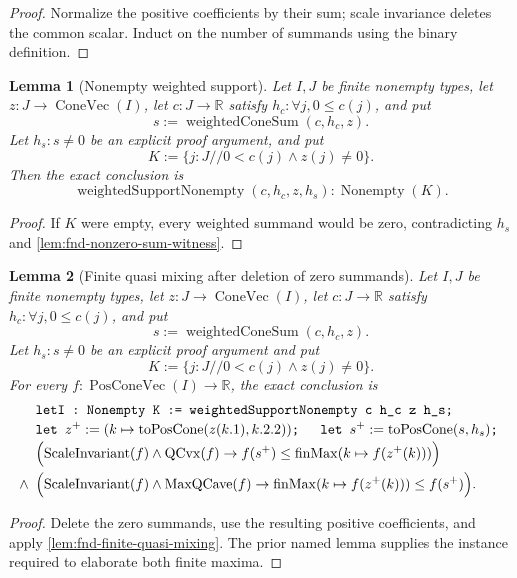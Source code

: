 \documentclass[9pt]{extarticle}
\newtheorem{lemma}{Lemma}[section]
\theoremstyle{definition}
\theoremstyle{remark}
\newcommand{\R}{\mathbb R}
\begin{document}
\begin{proof}
Normalize the positive coefficients by their sum; scale invariance deletes
the common scalar.  Induct on the number of summands using the binary
definition.
\end{proof}

\begin{lemma}[Nonempty weighted support]
\label{lem:fnd-weighted-support-nonempty}
Let $I,J$ be finite nonempty types, let
$z:J\to\operatorname{ConeVec}(I)$, let $c:J\to\R$ satisfy
$h_c:\forall j,0\leq c(j)$, and put
\[
 s:=\operatorname{weightedConeSum}(c,h_c,z).
\]
Let $h_s:s\neq0$ be an explicit proof argument, and put
\[
 K:=\{j:J\mathbin{//}0<c(j)\wedge z(j)\neq0\}.
\]
Then the exact conclusion is
\[
 \operatorname{weightedSupportNonempty}(c,h_c,z,h_s):
 \operatorname{Nonempty}(K).
\]
\end{lemma}

\begin{proof}
If $K$ were empty, every weighted summand would be zero, contradicting
$h_s$ and \cref{lem:fnd-nonzero-sum-witness}.
\end{proof}

\begin{lemma}[Finite quasi mixing after deletion of zero summands]
\label{lem:fnd-finite-quasi-mixing-delete-zero}
Let $I,J$ be finite nonempty types, let
$z:J\to\operatorname{ConeVec}(I)$, let $c:J\to\R$ satisfy
$h_c:\forall j,0\leq c(j)$, and put
\[
 s:=\operatorname{weightedConeSum}(c,h_c,z).
\]
Let $h_s:s\neq0$ be an explicit proof argument and put
\[
 K:=\{j:J\mathbin{//}0<c(j)\wedge z(j)\neq0\}.
\]
For every $f:\operatorname{PosConeVec}(I)\to\R$, the exact conclusion is
\begin{align*}
&\texttt{letI : Nonempty K :=
 weightedSupportNonempty c h\_c z h\_s; }\\[-2pt]
&\texttt{let }z^+:=
 (k\mapsto\operatorname{toPosCone}(z(k.1),k.2.2))\texttt{; }\quad
 \texttt{let }s^+:=\operatorname{toPosCone}(s,h_s)\texttt{; }\\[-2pt]
 &\Bigl(\operatorname{ScaleInvariant}(f)\wedge\operatorname{QCvx}(f)
   \to f(s^+)\leq\operatorname{finMax}(k\mapsto f(z^+(k)))\Bigr)\\
 {}\wedge{}\;&
 \Bigl(\operatorname{ScaleInvariant}(f)\wedge\operatorname{MaxQCave}(f)
   \to \operatorname{finMax}(k\mapsto f(z^+(k)))\leq f(s^+)\Bigr).
\end{align*}
\end{lemma}

\begin{proof}
Delete the zero summands, use the resulting positive coefficients, and apply
\cref{lem:fnd-finite-quasi-mixing}.  The prior named lemma supplies the
instance required to elaborate both finite maxima.
\end{proof}
\end{document}
